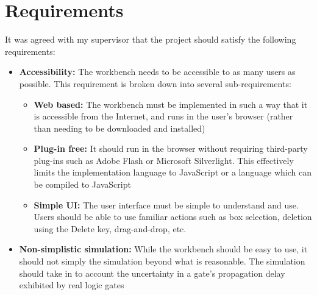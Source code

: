 \chapter{Requirements}
\label{chapter:requirements}
It was agreed with my supervisor that the project should satisfy the following requirements:

\begin{itemize}
	\item \textbf{Accessibility:} The workbench needs to be accessible to as many users as possible. This requirement is broken down into several sub-requirements:
	
		\begin{itemize}
			\item \textbf{Web based:} The workbench must be implemented in such a way that it is accessible from the Internet, and runs in the user's browser (rather than needing to be downloaded and installed) 
			
			\item \textbf{Plug-in free:} It should run in the browser without requiring third-party plug-ins such as Adobe Flash or Microsoft Silverlight. This effectively limits the implementation language to JavaScript or a language which can be compiled to JavaScript
			
			\item \textbf{Simple UI:} The user interface must be simple to understand and use. Users should be able to use familiar actions such as box selection, deletion using the Delete key, drag-and-drop, etc.
		\end{itemize}
	
	\item \textbf{Non-simplistic simulation:} While the workbench should be easy to use, it should not simply the simulation beyond what is reasonable. The simulation should take in to account the uncertainty in a gate's propagation delay exhibited by real logic gates
\end{itemize}

